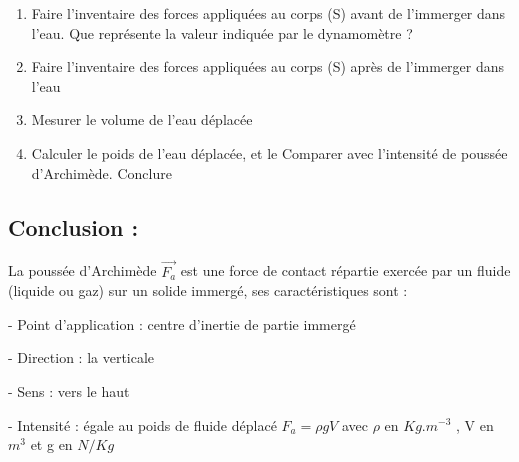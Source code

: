 \documentclass[12pt]{article}
\begin{document}
\begin{enumerate}
    \item Faire l’inventaire des forces appliquées au corps (S) avant de l’immerger dans l’eau. Que représente la
valeur indiquée par le dynamomètre ?
    \item Faire l’inventaire des forces appliquées au corps (S) après de l’immerger dans l’eau
    \item Mesurer le volume de l’eau déplacée
    \item Calculer le poids de l’eau déplacée, et le Comparer avec l’intensité de poussée d’Archimède. Conclure

\end{enumerate}

\subsection{Conclusion :  }

La poussée d'Archimède $\vec{F_a}$ est une force de contact répartie exercée par un fluide (liquide ou gaz) sur un solide immergé, ses caractéristiques sont :

 - Point d’application : centre d’inertie de partie immergé
 
 - Direction : la verticale

 - Sens : vers le haut

 - Intensité : égale au poids de fluide déplacé $F_a = \rho g V$
 avec $\rho$ en $Kg.m^{-3}$ , V en $m^3$ et g en $N/Kg$
\end{document}
